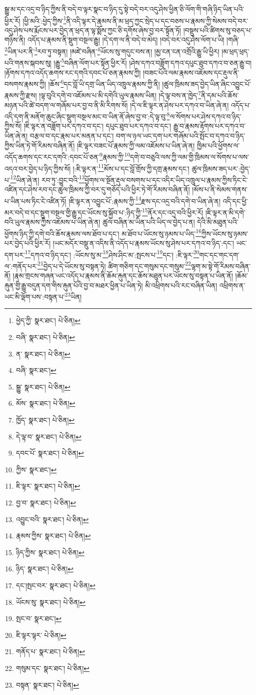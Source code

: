 སྒྱུ་མ་དང་འདྲ་བ་ཉིད་ཀྱིས་ནི་བདེ་བ་ལྟར་སྣང་བ་ཉིད་དུ་སྟེ་བདེ་བར་འདུ་ཤེས་ཕྱིན་ཅི་ལོག་གི་གཞི་ཉིད་ཡིན་པའི་ཕྱིར་རོ། །ཕྱི་མའི་:ཕྱེད་ཀྱིས་\footnote{ཕྱེད་ཀྱི་  སྣར་ཐང་།  པེ་ཅིན། }ནི་འདི་ལྟར་དེ་རྣམས་ནི་མ་ཕྲད་ཀྱང་སྲེད་པ་དང་བཅས་པ་རྣམས་ཀྱི་སེམས་བདེ་བར་འདུ་ཤེས་པས་རྨོངས་པར་བྱེད་ན་ཕྲད་ན་ལྟ་སྨོས་ཀྱང་ཅི་དགོས་ཞེས་བྱ་བར་སྟོན་ཏོ། །བསྡུས་པའི་ཚིགས་སུ་བཅད་པ་གཉིས་ནི། འདོད་པ་རྣམས་ནི་སྡུག་བསྔལ་རྒྱུ། །དེ་དག་ལ་ནི་བདེ་བ་མེད། །བདེ་བར་འདུ་ཤེས་ལོག་པ་ཡི། །གཞི་\footnote{བཞི་  སྣར་ཐང་།  པེ་ཅིན། }ཡིན་པར་ནི་\footnote{ན་  སྣར་ཐང་།  པེ་ཅིན། }རབ་ཏུ་བསྟན། །མཛེ་བཞིན་\footnote{བཞི་  སྣར་ཐང་། }ཡོངས་སུ་གདུང་བས་ན། །མྱ་ངན་ངན་འགྲོའི་རྒྱུ་ཡི་ཕྱིར། །མ་ཕྲད་ཕྲད་པའི་གནས་སྐབས་སུ། །རྒྱུ་\footnote{སྒྱུ་  སྣར་ཐང་།  པེ་ཅིན། }བཞིན་ལོག་པར་སྟོན་ཕྱིར་རོ། །ཤེས་དཀའ་བཟློག་དཀའ་དཔུང་ཐུབ་དཀའ་བ་ཅན་རྒྱུ་བ། །རྟོགས་དཀའ་འདོད་ཆགས་རང་དགའི་དབང་པོ་ཅན་རྣམས་ཀྱི། །བཟང་པོའི་ལམ་རྣམས་འཇོམས་དང་རྡུལ་ནི་བསགས་རྣམས་ཀྱི། །ཆོས་\footnote{མོས་  སྣར་ཐང་།  པེ་ཅིན། }དང་བློ་ཡི་དགྲ་ཡིན་ཡིད་འཁྲུལ་རྣམས་ཀྱི་ནི། །ཚུལ་ཁྲིམས་ཟད་བྱེད་ཡིན་ཞིང་འབྱུང་པོ་རྣམས་ཀྱི་རྫས། །ལྟ་བུའི་དགེ་བ་འཇོམས་པ་མི་དགེའི་ཡུལ་རྣམས་ཡིན། །དེ་ལྟ་བས་ན་ཁྱེད་\footnote{ཁྱོད་  སྣར་ཐང་།  པེ་ཅིན། }ནི་དམ་པའི་ཆོས་མཉན་པའི་ཚེ་བདག་ལ་གཞོམ་པར་བྱ་བ་ནི་མི་རིགས་སོ། །དེ་ལ་ཇི་ལྟར་ན་ཤེས་པར་དཀའ་བ་ཡིན་ཞེ་ན། འདོད་པ་འདི་དག་ནི་མནོག་ཆུང་ཞིང་སྡུག་བསྔལ་མང་བ་ཡིན་ནོ་ཞེས་བྱ་བ་:དེ་ལྟ་བུ་\footnote{དེ་ལྟ་བ་  སྣར་ཐང་།  པེ་ཅིན། }ལ་སོགས་པར་ཤེས་དཀའ་བ་ཉིད་ཀྱིས་སོ། །ཇི་ལྟར་ན་བཟློག་པར་དཀའ་བ་དང་། དཔུང་ཐུབ་པར་དཀའ་བ་དང་། རྒྱུ་བ་རྣམས་རྟོགས་པར་དཀའ་བ་ཡིན་ཞེ་ན། བརྩལ་བ་དང་རྣམ་པར་མནན་པ་དང་། བག་ལ་ཉལ་ཡང་དག་པར་གཞོམ་པའི་སྤོང་བ་དཀའ་བ་ཉིད་ཀྱིས་ཡིན་ཏེ་གོ་རིམས་བཞིན་ནོ། །ཇི་ལྟར་བཟང་པོ་རྣམས་ཀྱི་ལམ་འཇོམས་པ་ཡིན་ཞེ་ན། ཁྱིམ་པའི་ཕྱོགས་ལ་འདོད་ཆགས་དང་རང་དགའི་:དབང་པོ་ཅན་\footnote{དབང་པོ་  སྣར་ཐང་།  པེ་ཅིན། }རྣམས་ཀྱི་\footnote{ཀྱིས་  སྣར་ཐང་། }དགེ་བ་བཅུའི་ལས་ཀྱི་ལམ་གྱི་ཁྲིམས་ལ་སོགས་པ་ལས་འདའ་བར་བྱེད་པ་ཉིད་ཀྱིས་སོ། །:ཇི་ལྟར་ན་\footnote{ཇི་ལྟར་  སྣར་ཐང་།  པེ་ཅིན། }མོས་པ་དང་བློ་གྲོས་ཀྱི་དགྲ་རྣམས་དང་། ཚུལ་ཁྲིམས་ཟད་པར་:བྱེད་པ་\footnote{བྱ་བ་  སྣར་ཐང་།  པེ་ཅིན། }ཡིན་ཞེ་ན། རབ་ཏུ་:བྱུང་བའི་\footnote{འབྱུང་བའི་  སྣར་ཐང་།  པེ་ཅིན། }ཕྱོགས་ལ་སྔོན་རྡུལ་བསགས་པ་དང་འདིར་ཡིད་འཁྲུལ་པ་རྣམས་ཀྱིས་ཏིང་ངེ་འཛིན་དང་ཤེས་རབ་དང་ཚུལ་ཁྲིམས་ཀྱི་བར་དུ་གཅོད་པའི་ཕྱིར་ཏེ་གོ་རིམས་བཞིན་ནོ། །མོས་པ་ནི་སེམས་གནས་པ་ཡིན་པས་ཏིང་ངེ་འཛིན་ཏོ། །ཇི་ལྟར་ན་འབྱུང་པོ་:རྣམས་ཀྱི་\footnote{རྣམས་ཀྱིས་  སྣར་ཐང་།  པེ་ཅིན། }རྫས་དང་འདྲ་བའི་དགེ་བ་ཡིན་ཞེ་ན། འདི་དང་ཕྱི་མར་བདེ་བ་དང་སྡུག་བསྔལ་གྱི་རྒྱུ་དང་ཡོངས་སུ་སྐྱོབ་པ་:ཉིད་ཀྱི་\footnote{ཉིད་ཀྱིས་  སྣར་ཐང་།  པེ་ཅིན། }ནོར་དང་འདྲ་བའི་ཕྱིར་རོ། །ཇི་ལྟར་ན་མི་དགེ་བའི་ཡུལ་རྣམས་ཀྱིས་འཇོམས་པ་ཡིན་ཞེ་ན། ཚུལ་བཞིན་མ་ཡིན་པའི་ཡིད་ལ་བྱེད་པ་ན། དེའི་མི་མཐུན་པའི་ཕྱོགས་ཉིད་ཀྱི་དགེ་བའི་ཆོས་རྣམས་ལས་ཐོབ་པ་དང་། མ་ཐོབ་པ་ཡོངས་སུ་ཉམས་པ་ཡིད་\footnote{ཉིད་  སྣར་ཐང་།  པེ་ཅིན། }ཀྱིས་ཡོངས་སུ་ཉམས་པར་བྱེད་པའི་ཕྱིར་རོ། །ཡང་མདོར་བསྡུ་ན་འདིས་ནི་འདོད་པ་རྣམས་ཡོངས་སུ་ཤེས་པར་དཀའ་བ་ཉིད་:དང་། ཡང་དག་པར་\footnote{དང་།སྤང་བར་  སྣར་ཐང་།  པེ་ཅིན། }དཀའ་བ་ཉིད་དང་། :ཡོངས་སུ་མ་\footnote{ཡོངས་སུ་  སྣར་ཐང་།  པེ་ཅིན། }ཤེས་ཤིང་མ་:སྤངས་པ་\footnote{སྤང་བ་  སྣར་ཐང་། }དང་། :ཇི་ལྟར་\footnote{ཇི་ལྟར་ལྟར་  པེ་ཅིན། }གང་དང་གང་དག་ལ་:གནོད་པར་\footnote{གནོད་པ་  སྣར་ཐང་།  པེ་ཅིན། }བྱེད་པ་དེ་ཡོངས་སུ་བསྟན་ཏེ། ཚིག་གཅིག་དང་གསུམ་དང་གསུམ་\footnote{གསུམ་དང་  སྣར་ཐང་།  པེ་ཅིན། }ལྷག་མ་སྟེ་གོ་རིམས་བཞིན་ནོ། །རྣམ་གྲངས་གཞན་ཡང་འདོད་པ་རྣམས་ནི་ཆོམ་རྐུན་དང་ཆོས་མཐུན་པར་ཡོངས་སུ་བསྟན་པ་ཡིན་ནོ། །ཆོམ་རྐུན་གྱི་རྒྱུ་བདུན་དག་གིས་རྐུན་པོའི་བྱ་བ་མཐར་ཕྱིན་པ་ཡིན་ཏེ། མི་འཕྲིགས་པའི་རང་བཞིན་ཡིན། འཕྲིགས་ན་ཡང་མི་ལྡོག་པས་:བསྟན་པ་\footnote{བསྟན་  སྣར་ཐང་།  པེ་ཅིན། }ཡིན། 